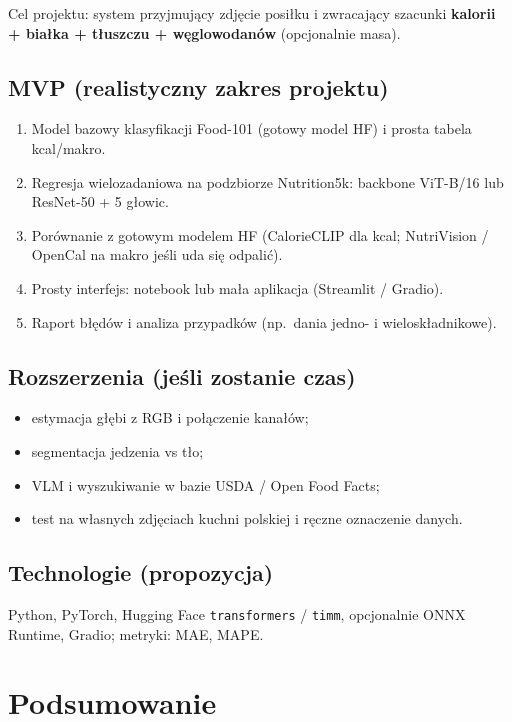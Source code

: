 \documentclass[11pt,a4paper]{article}
\begin{document}
Cel projektu: system przyjmujący zdjęcie posiłku i zwracający
szacunki \textbf{kalorii + białka + tłuszczu + węglowodanów}
(opcjonalnie masa).

\subsection{MVP (realistyczny zakres projektu)}
\begin{enumerate}[leftmargin=*]
  \item Model bazowy klasyfikacji Food-101 (gotowy model HF) i prosta tabela kcal/makro.
  \item Regresja wielozadaniowa na podzbiorze Nutrition5k:
        backbone ViT-B/16 lub ResNet-50 + 5 głowic.
  \item Porównanie z gotowym modelem HF (CalorieCLIP dla kcal;
        NutriVision / OpenCal na makro jeśli uda się odpalić).
  \item Prosty interfejs: notebook lub mała aplikacja (Streamlit / Gradio).
  \item Raport błędów i analiza przypadków (np.\ dania jedno- i wieloskładnikowe).
\end{enumerate}

\subsection{Rozszerzenia (jeśli zostanie czas)}
\begin{itemize}[leftmargin=*]
  \item estymacja głębi z RGB i połączenie kanałów;
  \item segmentacja jedzenia vs tło;
  \item VLM i wyszukiwanie w bazie USDA / Open Food Facts;
  \item test na własnych zdjęciach kuchni polskiej i ręczne oznaczenie danych.
\end{itemize}

\subsection{Technologie (propozycja)}
Python, PyTorch, Hugging Face \texttt{transformers} / \texttt{timm},
opcjonalnie ONNX Runtime, Gradio; metryki: MAE, MAPE.

\section{Podsumowanie}
\end{document}
